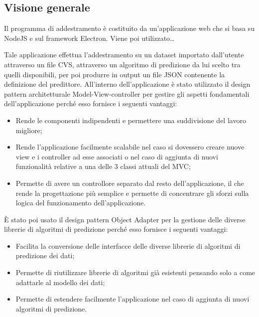 \documentclass[../manuale-sviluppatore.tex]{subfiles}
\begin{document}
\subsection{Visione generale}%
\label{subs:installazione_applicazione_di_addestramento}
Il programma di addestramento è costituito da un'applicazione web che si basa su NodeJS e sul framework Electron. Viene poi utilizzato\dots

Tale applicazione effettua l'addestramento su un dataset importato dall'utente attraverso un file CVS, attraverso un algoritmo di predizione da lui scelto tra quelli disponibili, per poi produrre in output
un file JSON contenente la definizione del predittore.
All'interno dell'applicazione è stato utilizzato il design pattern architetturale Model-View-controller per gestire gli aspetti fondamentali dell'applicazione perché esso fornisce i seguenti vantaggi:
\begin{itemize}
    \item Rende le componenti indipendenti e permettere una suddivisione del lavoro migliore;
    \item Rende l'applicazione facilmente scalabile nel caso si dovessero creare nuove view e i controller ad esse associati o nel caso di aggiunta di nuovi funzionalità relative a una delle 3 classi attuali del MVC;
    \item Permette di avere un controllore separato dal resto dell’applicazione, il che rende la progettazione più semplice e permette di concentrare gli sforzi sulla logica del funzionamento dell'applicazione.
\end{itemize}

È stato poi usato il design pattern Object Adapter per la gestione delle diverse librerie di algoritmi di predizione perché esso fornisce i seguenti vantaggi:
\begin{itemize}
    \item Facilita la conversione delle interfacce delle diverse librerie di algoritmi di predizione dei dati;
    \item Permette di riutilizzare librerie di algoritmi già esistenti pensando solo a come adattarle al modello dei dati;
    \item Permette di estendere facilmente l'applicazione nel caso di aggiunta di nuovi algoritmi di predizione.
\end{itemize}
\end{document}
